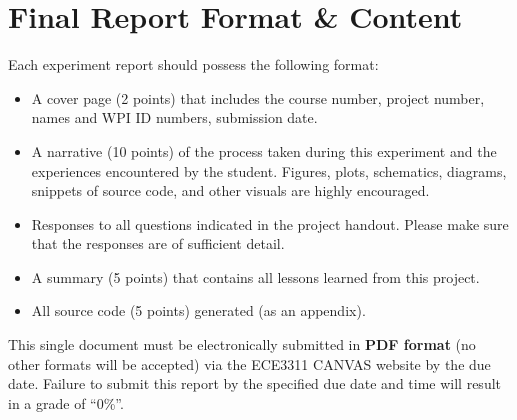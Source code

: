 \documentclass[letterpaper,12pt]{article}
\begin{document}
\section{Final Report Format \& Content}

Each experiment report should possess the following format:
\begin{itemize}
 \item A cover page (2 points) that includes the course number, project number, names and WPI ID numbers, submission date.
 \item A narrative (10 points) of the process taken during this experiment and the experiences encountered by the student.  Figures, plots, schematics, diagrams, snippets of source code, and other visuals are highly encouraged.
 \item Responses to all questions indicated in the project handout.   Please make sure that the responses are of sufficient detail.
 \item A summary (5 points) that contains all lessons learned from this project.
 \item All source code (5 points) generated (as an appendix).
\end{itemize}

This single document must be electronically submitted in {\bf PDF format} (no other formats will be accepted) via the ECE3311 CANVAS website by the due date. Failure to submit this report by the specified due date and time will result in a grade of ``0\%''.
\end{document}
